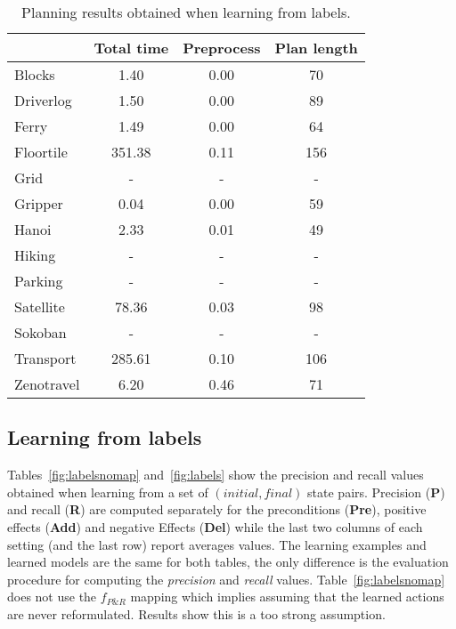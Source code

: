 \documentclass{article}
\begin{document}
\begin{table}
	\begin{footnotesize}
		\begin{center}
			\begin{tabular}{l|c|c|c|}			
				& Total time & Preprocess & Plan length  \\
				\hline
				Blocks & 1.40 & 0.00 & 70  \\
				Driverlog & 1.50 & 0.00 & 89 \\
				Ferry & 1.49 & 0.00 & 64 \\
				Floortile & 351.38 & 0.11 & 156 \\
				Grid & - & - & - \\ %
				Gripper & 0.04 & 0.00 & 59 \\
				Hanoi & 2.33 & 0.01 & 49  \\
				Hiking & - & - & - \\ %
				Parking & - & - & - \\ %
				Satellite & 78.36 & 0.03 & 98 \\
				Sokoban & - & - & - \\ %
				Transport & 285.61 & 0.10 & 106 \\
				Zenotravel & 6.20 & 0.46 & 71 \\
			\end{tabular}
		\end{center}
	\end{footnotesize}
 \caption{\small Planning results obtained when learning from labels.}
\label{fig:planlabels}                        
\end{table}

\subsection{Learning from labels}
Tables~\ref{fig:labelsnomap} and~\ref{fig:labels} show the precision and recall values obtained when learning from a set of $(initial, final)$ state pairs. Precision ({\bf P}) and recall ({\bf R}) are computed separately for the preconditions ({\bf Pre}), positive effects ({\bf Add}) and negative Effects ({\bf Del}) while the last two columns of each setting (and the last row) report averages values. The learning examples and learned models are the same for both tables, the only difference is the evaluation procedure for computing the {\em precision} and {\em recall} values. Table~\ref{fig:labelsnomap} does not use the $f_{P\&R}$ mapping which implies assuming that the learned actions are never reformulated. Results show this is a too strong assumption. 
\end{document}
